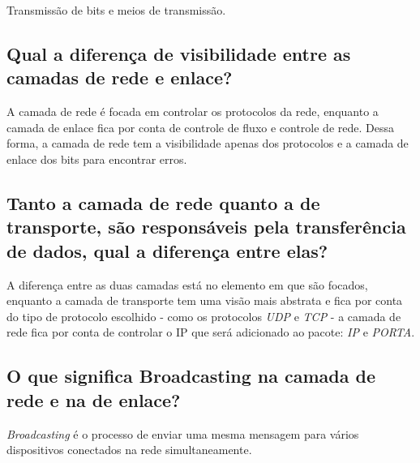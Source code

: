 Transmissão de bits e meios de transmissão.

\subsection{Qual a diferença de visibilidade entre as camadas de rede e
enlace?}

A camada de rede é focada em controlar os protocolos
da rede, enquanto a camada de enlace fica por conta 
de controle de fluxo e controle de rede. Dessa forma,
a camada de rede tem a visibilidade apenas dos protocolos
e a camada de enlace dos bits para encontrar erros.

\subsection{Tanto a camada de rede quanto a de transporte, são
responsáveis pela transferência de dados, qual a diferença
entre elas?}

A diferença entre as duas camadas está no elemento em que 
são focados, enquanto a camada de transporte tem uma visão
mais abstrata e fica por conta do tipo de protocolo escolhido
- como os protocolos \emph{UDP} e \emph{TCP} - a camada de rede
fica por conta de controlar o IP que será adicionado ao pacote:
\emph{IP} e \emph{PORTA}.
 
\subsection{O que significa Broadcasting na camada de rede e na de
enlace?}

\emph{Broadcasting} é o processo de enviar uma mesma mensagem
para vários dispositivos conectados na rede simultaneamente.